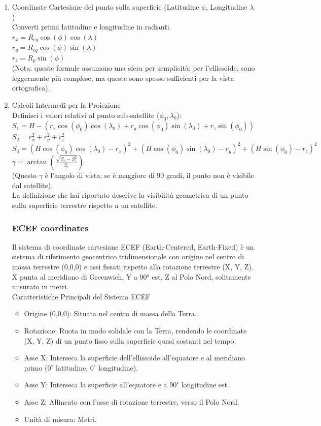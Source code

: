 \documentclass[a4paper,14pt]{article}
\begin{document}
\begin{enumerate}
\item Coordinate Cartesiane del punto sulla superficie (Latitudine \(\phi \), Longitudine \(\lambda \))\\
Converti prima latitudine e longitudine in radianti.\\
\(r_{x}=R_{eq}\cos (\phi )\cos (\lambda )\) \\
\(r_{y}=R_{eq}\cos (\phi )\sin (\lambda )\) \\
\(r_{z}=R_{p}\sin (\phi )\) \\
(Nota: queste formule assumono una sfera per semplicità; per l'ellissoide, sono leggermente più complese, ma queste sono spesso sufficienti per la vista ortografica).
\item Calcoli Intermedi per la Proiezione \\
Definisci i valori relativi al punto sub-satellite (\(\phi _{0},\lambda _{0}\)): \\
\(S_{1}=H-(r_{x}\cos (\phi _{0})\cos (\lambda _{0})+r_{y}\cos (\phi _{0})\sin (\lambda _{0})+r_{z}\sin (\phi _{0}))\) \\
\(S_{2}=r_{x}^{2}+r_{y}^{2}+r_{z}^{2}\) \\
\(S_{3}=(H\cos (\phi _{0})\cos (\lambda _{0})-r_{x})^{2}+(H\cos (\phi _{0})\sin (\lambda _{0})-r_{y})^{2}+(H\sin (\phi _{0})-r_{z})^{2}\) \\
\(\gamma =\arctan \left(\frac{\sqrt{S_{2}-S_{1}^{2}}}{S_{1}}\right)\) \\
(Questo \(\gamma \) è l'angolo di vista; se è maggiore di 90 gradi, il punto non è visibile dal satellite).\\
La definizione che hai riportato descrive la visibilità geometrica di un punto sulla superficie terrestre rispetto a un
satellite.
\subsubsection{ECEF coordinates}
Il sistema di coordinate cartesiane ECEF (Earth-Centered, Earth-Fixed) è un sistema di riferimento geocentrico tridimensionale con origine nel centro di massa terrestre (0,0,0) e assi fissati rispetto alla rotazione terrestre (X, Y, Z). X punta al meridiano di Greenwich, Y a 90° est, Z al Polo Nord, solitamente misurato in metri.\\
Caratteristiche Principali del Sistema ECEF
\begin{itemize}
\item Origine (0,0,0): Situata nel centro di massa della Terra.
\item Rotazione: Ruota in modo solidale con la Terra, rendendo le coordinate (X, Y, Z) di un punto fisso sulla superficie quasi costanti nel tempo.
\item Asse X: Interseca la superficie dell'ellissoide all'equatore e al meridiano primo (\(0^{\circ }\) latitudine, \(0^{\circ }\) longitudine).
\item Asse Y: Interseca la superficie all'equatore e a \(90^{\circ }\) longitudine est.
\item Asse Z: Allineato con l'asse di rotazione terrestre, verso il Polo Nord.
\item Unità di misura: Metri.
\end{itemize}
\end{enumerate}
\end{document}

